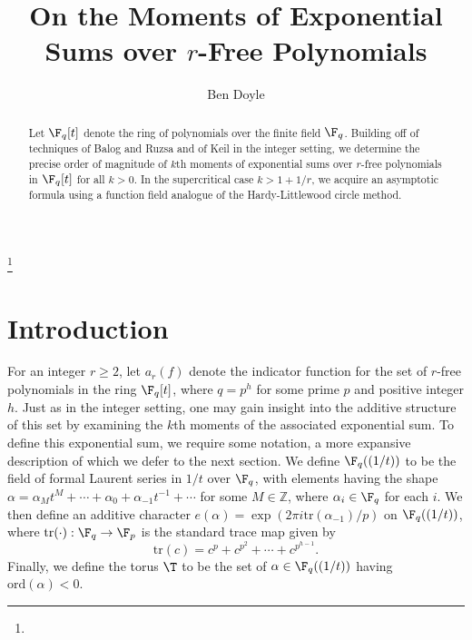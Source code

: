 \documentclass[reqno,11pt]{amsart}
\theoremstyle{definition}
\theoremstyle{remark}
\numberwithin{equation}{section}
\def\Z{{\mathbb Z}}\def\Q{{\mathbb Q}}
\newcommand{\ord}{\text{ord}}
\newcommand{\tr}{\text{tr}}
\newcommand{\<}{\begin{equation}}
\renewcommand{\>}{\end{equation}}
\begin{document}
\title[Moments of Exponential Sums]{On the Moments of Exponential Sums over $r$-Free Polynomials}
\author[Ben Doyle]{Ben Doyle}
\address{Department of Mathematics, Purdue University, 150 N. University Street, West 
Lafayette, IN 47907-2067, USA}
\thanks{}
\date{}

\begin{abstract} Let $\F_q[t]$ denote the ring of polynomials over the finite field $\F_q$. Building off of techniques of Balog and Ruzsa and of Keil in the integer setting, we determine the precise order of magnitude of $k$th moments of exponential sums over $r$-free polynomials in $\F_q[t]$ for all $k>0$. In the supercritical case $k>1+1/r$, we acquire an asymptotic formula using a function field analogue of the Hardy-Littlewood circle method.  \end{abstract}

\maketitle




















\section{Introduction}

For an integer $r\geq 2$, let $a_r(f)$ denote the indicator function for the set of $r$-free polynomials in the ring $\F_q[t]$, where $q=p^h$ for some prime $p$ and positive integer $h$. Just as in the integer setting, one may gain insight into the additive structure of this set by examining the $k$th moments of the associated exponential sum. To define this exponential sum, we require some notation, a more expansive description of which we defer to the next section. We define $\F_q((1/t))$ to be the field of formal Laurent series in $1/t$ over $\F_q$, with elements having the shape $\alpha = \alpha_Mt^M+\cdots +\alpha_0+\alpha_{-1}t^{-1}+\cdots$ for some $M \in \Z$, where $\alpha_i \in \F_q$ for each $i$. We then define an additive character $e(\alpha) = \exp(2\pi i\tr(\alpha_{-1})/p)$ on $\F_q((1/t))$, where $\tr(\cdot):\F_q\rightarrow \F_p$ is the standard trace map given by
\<\label{trace}
\tr(c) = c^p+c^{p^2}+\cdots+c^{p^{h-1}}.
\>
Finally, we define the torus $\T$ to be the set of $\alpha \in \F_q((1/t))$ having $\ord(\alpha)<0$.
\end{document}
